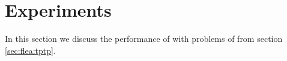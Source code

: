 \section{Experiments}\label{sec:flea:evaluation}

In this section we discuss the performance of \FLEA with problems of \TPTP from section \vref{sec:flea:tptp}.



